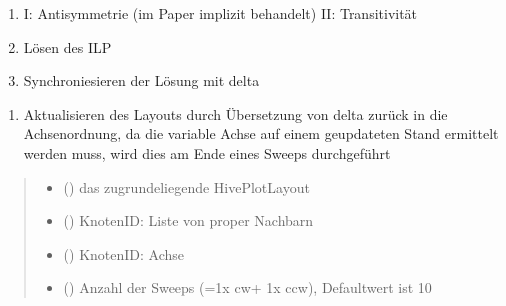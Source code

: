 \documentclass[a4paper,10pt,ngerman]{sphinxmanual}
\begin{document}
\begin{fulllineitems}
\begin{enumerate}
\item {} \begin{description}
\sphinxAtStartPar
I: Antisymmetrie (im Paper implizit behandelt)
II: Transitivität

\end{description}

\item {} 
\sphinxAtStartPar
Lösen des ILP

\item {} 
\sphinxAtStartPar
Synchroniesieren der Lösung mit delta

\end{enumerate}
\begin{enumerate}
%
\setcounter{enumi}{3}
\item {} 
\sphinxAtStartPar
Aktualisieren des Layouts durch Übersetzung von delta zurück in die Achsenordnung, da die variable Achse auf einem geupdateten Stand ermittelt werden muss, wird dies am Ende eines Sweeps durchgeführt

\end{enumerate}
\begin{quote}\begin{description}
\begin{itemize}
\item {} 
\sphinxAtStartPar
{} () \textendash{} das zugrundeliegende HivePlotLayout

\item {} 
\sphinxAtStartPar
{} () \textendash{} KnotenID: Liste von proper Nachbarn

\item {} 
\sphinxAtStartPar
{} () \textendash{} KnotenID: Achse

\item {} 
\sphinxAtStartPar
{} () \textendash{} Anzahl der Sweeps (=1x cw+ 1x ccw), Defaultwert ist 10


\end{itemize}
\end{description}
\end{quote}
\end{fulllineitems}
\end{document}
